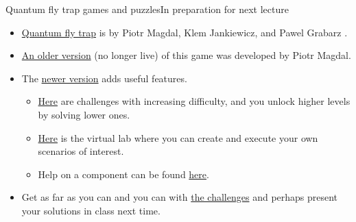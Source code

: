 \begin{frame}{Quantum fly trap games and puzzles}{In preparation for next lecture}

\begin{itemize}
    \item \href{https://quantumflytrap.com/}{Quantum fly trap} is by Piotr Magdal, Klem Jankiewicz, and Pawel Grabarz .
    \item \href{https://github.com/stared/quantum-game}{An older version} (no longer live) of this game was developed by Piotr Magdal.
    \item The \href{https://quantumflytrap.com}{newer version} adds useful features.
    \begin{itemize}
    \item \href{https://lab.quantumflytrap.com/game}{Here} are challenges with increasing difficulty, and you unlock higher levels by solving lower ones.
    \item \href{https://lab.quantumflytrap.com/lab}{Here} is the virtual lab where you can create and execute your own scenarios of interest.  
    \item Help on a component can be found \href{https://lab.quantumflytrap.com/info/}{here}.
    \end{itemize}
    \item \alert{Get as far as you can and you can with \href{https://lab.quantumflytrap.com/game}{the challenges} and perhaps present your solutions in class next time.}
\end{itemize}
    
\end{frame}


